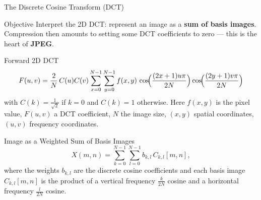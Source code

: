\documentclass{beamer}
\begin{document}
\begin{frame}[shrink=10]{The Discrete Cosine Transform (DCT)}
  \begin{block}{Objective}
    Interpret the 2D DCT: represent an image as a \textbf{sum of basis
    images}. Compression then amounts to setting some DCT coefficients to
    zero --- this is the heart of \textbf{JPEG}.
  \end{block}

  \begin{block}{Forward 2D DCT}
    \[
      F(u,v)
        = \frac{2}{N}\,C(u)C(v)
          \sum_{x=0}^{N-1}\sum_{y=0}^{N-1}
          f(x,y)\,
          \cos\!\Bigl(\frac{(2x+1)u\pi}{2N}\Bigr)
          \cos\!\Bigl(\frac{(2y+1)v\pi}{2N}\Bigr)
    \]
    with $C(k) = \tfrac{1}{\sqrt2}$ if $k=0$ and $C(k)=1$ otherwise.
    Here $f(x,y)$ is the pixel value, $F(u,v)$ a DCT coefficient,
    $N$ the image size, $(x,y)$ spatial coordinates, $(u,v)$ frequency
    coordinates.
  \end{block}

  \begin{block}{Image as a Weighted Sum of Basis Images}
    \[
      X(m,n) = \sum_{k=0}^{N-1}\sum_{l=0}^{N-1}
        b_{k,l}\,C_{k,l}[m,n],
    \]
    where the weights $b_{k,l}$ are the discrete cosine coefficients and
    each basis image $C_{k,l}[m,n]$ is the product of a vertical frequency
    $\tfrac{k}{2N}$ cosine and a horizontal frequency $\tfrac{l}{2N}$
    cosine.
  \end{block}
\end{frame}
\end{document}
